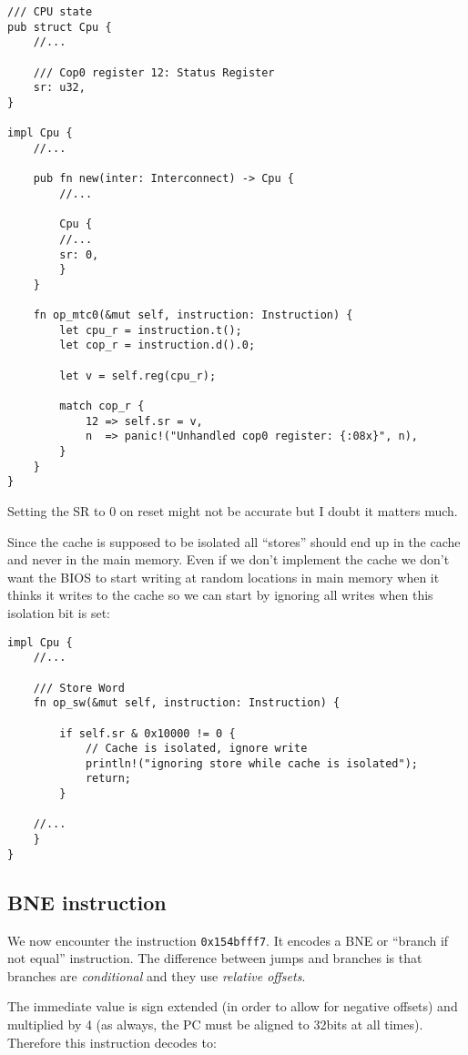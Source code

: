 \documentclass[a4paper]{article}
\newcommand{\code}[1] {\texttt{#1}}
\begin{document}
\begin{lstlisting}
/// CPU state
pub struct Cpu {
    //...

    /// Cop0 register 12: Status Register
    sr: u32,
}

impl Cpu {
    //...

    pub fn new(inter: Interconnect) -> Cpu {
        //...

        Cpu {
	    //...
	    sr: 0,
        }
    }

    fn op_mtc0(&mut self, instruction: Instruction) {
        let cpu_r = instruction.t();
        let cop_r = instruction.d().0;

        let v = self.reg(cpu_r);

        match cop_r {
            12 => self.sr = v,
            n  => panic!("Unhandled cop0 register: {:08x}", n),
        }
    }
}
\end{lstlisting}

Setting the SR to 0 on reset might not be accurate but I doubt it
matters much.

Since the cache is supposed to be isolated all ``stores'' should end
up in the cache and never in the main memory. Even if we don't
implement the cache we don't want the BIOS to start writing at random
locations in main memory when it thinks it writes to the cache so we
can start by ignoring all writes when this isolation bit is set:

\begin{lstlisting}
impl Cpu {
    //...

    /// Store Word
    fn op_sw(&mut self, instruction: Instruction) {

        if self.sr & 0x10000 != 0 {
            // Cache is isolated, ignore write
            println!("ignoring store while cache is isolated");
            return;
        }

	//...
    }
}
\end{lstlisting}

\subsection{BNE instruction}

We now encounter the instruction \code{0x154bfff7}. It encodes a BNE
or ``branch if not equal'' instruction. The difference between jumps
and branches is that branches are \emph{conditional} and they use
\emph{relative offsets}.

The immediate value is sign extended (in order to allow for negative
offsets) and multiplied by 4 (as always, the PC must be aligned to
32bits at all times). Therefore this instruction decodes to:
\end{document}

